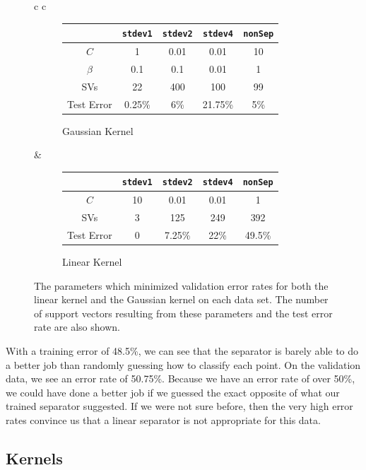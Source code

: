 \documentclass{sigchi}
\begin{document}
\begin{figure}
\centering
\renewcommand*{\arraystretch}{1.5}

\begin{tabular}{c c}
\begin{subfigure}[b]{3.5in}
\centering
	\begin{tabular}{| c | c | c | c | c |}
	\hline
	& \texttt{stdev1} & \texttt{stdev2} & \texttt{stdev4} & \texttt{nonSep}\\
	\hline
	$C$ & 1 & 0.01 & 0.01 & 10 \\
	\hline
	$\beta$ & 0.1 & 0.1 & 0.01 & 1 \\
	\hline
	SVs & 22 & 400 & 100 & 99 \\
	\hline
	Test Error & 0.25\% & 6\% & 21.75\% & 5\% \\
	\hline
	\end{tabular}
	\caption{Gaussian Kernel}
\end{subfigure}
&
\begin{subfigure}[b]{3.5in}
\centering
	\begin{tabular}{| c | c | c | c | c |}
	\hline
	& \texttt{stdev1} & \texttt{stdev2} & \texttt{stdev4} & \texttt{nonSep}\\
	\hline
	$C$ & 10 & 0.01 & 0.01 & 1 \\
	\hline
	SVs & 3 & 125 & 249 & 392 \\
	\hline
	Test Error & 0 & 7.25\% & 22\% & 49.5\%\\
	\hline
	\end{tabular}
	\caption{Linear Kernel}
\end{subfigure}
\end{tabular}

\caption{The parameters which minimized validation error rates for both the linear kernel and the Gaussian kernel on each data set. The number of support vectors resulting from these parameters and the test error rate are also shown.}
\end{figure}

With a training error of 48.5\%, we can see that the separator is barely able to do a better job than randomly guessing how to classify each point. On the validation data, we see an error rate of 50.75\%. Because we have an error rate of over 50\%, we could have done a better job if we guessed the exact opposite of what our trained separator suggested. If we were not sure before, then the very high error rates convince us that a linear separator is not appropriate for this data.

\subsection{Kernels}
\end{document}
